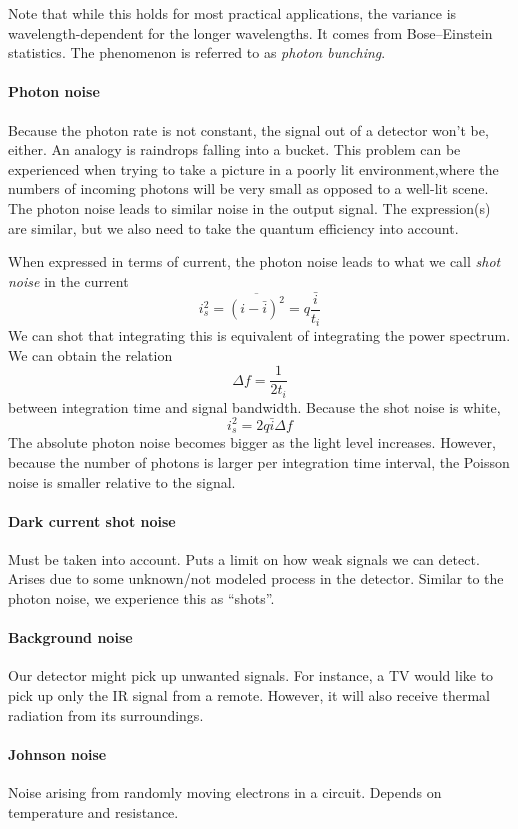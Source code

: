 \documentclass[article]{memoir}
\begin{document}
Note that while this holds for most practical applications, the variance is wavelength-dependent for the longer wavelengths. It comes from Bose--Einstein statistics. The phenomenon is referred to as \emph{photon bunching}.

\paragraph{Photon noise}

Because the photon rate is not constant, the signal out of a detector won't be, either. An analogy is raindrops falling into a bucket. This problem can be experienced when trying to take a picture in a poorly lit environment,where the numbers of incoming photons will be very small as opposed to a well-lit scene. The photon noise leads to similar noise in the output signal. The expression(s) are similar, but we also need to take the quantum efficiency into account.

When expressed in terms of current, the photon noise leads to what we call \emph{shot noise} in the current
\[
    i_s^2 = \overline{(i - \bar i)^2} = q \frac{\bar i}{t_i}
\]
We can shot that integrating this is equivalent of integrating the power spectrum. We can obtain the relation
\[
    \Delta f = \frac{1}{2 t_i}
\]
between integration time and signal bandwidth. Because the shot noise is white,
\[
    i_s^2 = 2q\bar i \Delta f
\]
The absolute photon noise becomes bigger as the light level increases. However, because the number of photons is larger per integration time interval, the Poisson noise is smaller relative to the signal.

\paragraph{Dark current shot noise}
Must be taken into account. Puts a limit on how weak signals we can detect. Arises due to some unknown/not modeled process in the detector. Similar to the photon noise, we experience this as ``shots''.

\paragraph{Background noise}
Our detector might pick up unwanted signals. For instance, a TV would like to pick up only the IR signal from a remote. However, it will also receive thermal radiation from its surroundings.

\paragraph{Johnson noise}
Noise arising from randomly moving electrons in a circuit. Depends on temperature and resistance.
\end{document}

